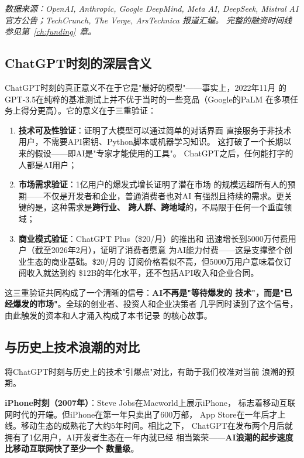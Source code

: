 \begin{table}[htbp]
\medskip
\noindent\textit{数据来源：OpenAI, Anthropic, Google DeepMind, Meta AI, DeepSeek,
Mistral AI 官方公告；TechCrunch, The Verge, ArsTechnica 报道汇编。
完整的融资时间线参见第~\ref{ch:funding}~章。}
\end{table}

\subsection{ChatGPT时刻的深层含义}

ChatGPT时刻的真正意义不在于它是"最好的模型"——事实上，2022年11月
的GPT-3.5在纯粹的基准测试上并不优于当时的一些竞品（Google的PaLM
在多项任务上得分更高）。它的意义在于三重验证：

\begin{enumerate}
  \item \textbf{技术可及性验证}：证明了大模型可以通过简单的对话界面
    直接服务于非技术用户，不需要API密钥、Python脚本或机器学习知识。
    这打破了一个长期以来的假设——即AI是"专家才能使用的工具"。
    ChatGPT之后，任何能打字的人都是AI用户；
  \item \textbf{市场需求验证}：1亿用户的爆发式增长证明了潜在市场
    的规模远超所有人的预期——不仅是开发者和企业，普通消费者也对AI
    有强烈且持续的需求。更关键的是，这种需求是\textbf{跨行业、
    跨人群、跨地域}的，不局限于任何一个垂直领域；
  \item \textbf{商业模式验证}：ChatGPT Plus（\$20/月）的推出和
    迅速增长到5000万付费用户（截至2026年2月），证明了消费者愿意
    为AI能力付费——这是支撑整个创业生态的商业基础。\$20/月的
    订阅价格看似不高，但5000万用户意味着仅订阅收入就达到约
    \$12B的年化水平，还不包括API收入和企业合同。
\end{enumerate}

这三重验证共同构成了一个清晰的信号：\textbf{AI不再是"等待爆发的
技术"，而是"已经爆发的市场"}。全球的创业者、投资人和企业决策者
几乎同时读到了这个信号，由此触发的资本和人才涌入构成了本书记录
的核心故事。

\subsection{与历史上技术浪潮的对比}

将ChatGPT时刻与历史上的技术"引爆点"对比，有助于我们校准对当前
浪潮的预期。

\textbf{iPhone时刻（2007年）}：Steve Jobs在Macworld上展示iPhone，
标志着移动互联网时代的开端。但iPhone在第一年只卖出了600万部，
App Store在一年后才上线。移动生态的成熟花了大约5年时间。相比之下，
ChatGPT在发布两个月后就拥有了1亿用户，AI开发者生态在一年内就已经
相当繁荣——\textbf{AI浪潮的起步速度比移动互联网快了至少一个
数量级}。

